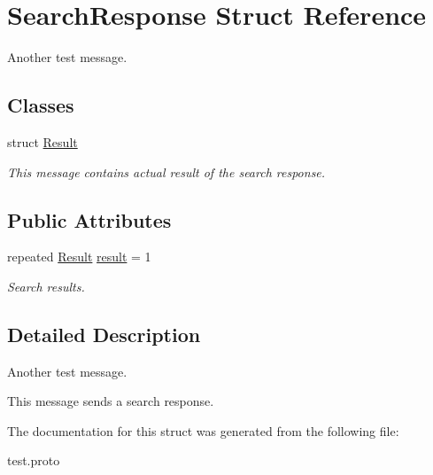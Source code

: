 \hypertarget{structSearchResponse}{}\section{Search\+Response Struct Reference}
\label{structSearchResponse}


Another test message.  


\subsection*{Classes}
\begin{DoxyCompactItemize}
\item 
struct \hyperlink{structSearchResponse_1_1Result}{Result}
\begin{DoxyCompactList}\small\item\em This message contains actual result of the search response. \end{DoxyCompactList}\end{DoxyCompactItemize}
\subsection*{Public Attributes}
\begin{DoxyCompactItemize}
\item 
repeated \hyperlink{structSearchResponse_1_1Result}{Result} \hyperlink{structSearchResponse_afe10589dd2aa8f39c88c466d31063183}{result} = 1\hypertarget{structSearchResponse_afe10589dd2aa8f39c88c466d31063183}{}\label{structSearchResponse_afe10589dd2aa8f39c88c466d31063183}

\begin{DoxyCompactList}\small\item\em Search results. \end{DoxyCompactList}\end{DoxyCompactItemize}


\subsection{Detailed Description}
Another test message. 

This message sends a search response. 

The documentation for this struct was generated from the following file\+:\begin{DoxyCompactItemize}
\item 
test.\+proto\end{DoxyCompactItemize}

